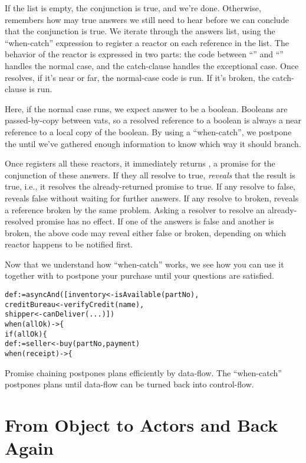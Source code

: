 \documentclass{llncs}
\begin{document}
If the list is empty, the conjunction is true, and we're
done. Otherwise,  remembers how may true answers we
still need to hear before we can conclude that the conjunction is
true. We iterate through the answers list, using the ``when-catch''
expression to register a reactor on each reference in the list. The
behavior of the reactor is expressed in two parts: the code between
``\code{-> \{}'' and ``'' handles the normal case, and
the catch-clause handles the exceptional case. Once 
resolves, if it's near or far, the normal-case code is run. If it's
broken, the catch-clause is run.

Here, if the normal case runs, we expect answer to be a
boolean. Booleans are passed-by-copy between vats, so a resolved
reference to a boolean is always a near reference to a local copy of
the boolean. By using a ``when-catch'', we postpone the 
until we've gathered enough information to know which way it should
branch.

Once  registers all these reactors, it immediately
returns , a promise for the conjunction of these
answers. If they all resolve to true,  \emph{reveals}
that the result is true, i.e., it resolves the already-returned
promise to true. If any resolve to false,  reveals false
without waiting for further answers. If any resolve to broken,
 reveals a reference broken by the same problem. Asking
a resolver to resolve an already-resolved promise has no effect. If
one of the answers is false and another is broken, the above
 code may reveal either false or broken, depending on
which reactor happens to be notified first.

Now that we understand how ``when-catch'' works, we see how you can
use it together with  to postpone your purchase until
your questions are satisfied.
%
\begin{alltt}
    def  := asyncAnd([inventory <- isAvailable(partNo),
                           creditBureau <- verifyCredit(name),
                           shipper <- canDeliver(...)])
    when (allOk) -> \{
        if (allOk) \{
            def  := seller <- buy(partNo, payment)
            when (receipt) -> \{
\end{alltt}
%
Promise chaining postpones plans efficiently by data-flow. The
``when-catch'' postpones plans until data-flow can be turned back into
control-flow.

\section{From Object to Actors and Back Again}
\end{document}
